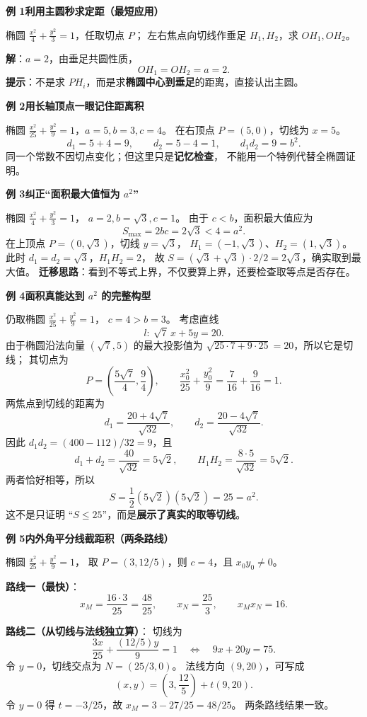 \begin{examplebox}
\textbf{例 1\quad 利用主圆秒求定距（最短应用）}

椭圆 $\frac{x^2}{4}+\frac{y^2}{3}=1$，任取切点 $P$；
左右焦点向切线作垂足 $H_1,H_2$，求 $OH_1,OH_2$。

\textbf{解}：$a=2$，由垂足共圆性质，
\[
\boxed{OH_1=OH_2=a=2}.
\]
\textbf{提示}：不是求 $PH_i$，而是求\textbf{椭圆中心到垂足}的距离，直接认出主圆。

\medskip
\textbf{例 2\quad 用长轴顶点一眼记住距离积}

椭圆 $\frac{x^2}{25}+\frac{y^2}{9}=1$，$a=5,b=3,c=4$。
在右顶点 $P=(5,0)$，切线为 $x=5$。
\[
d_1=5+4=9,\qquad d_2=5-4=1,
\qquad \boxed{d_1d_2=9=b^2}.
\]
同一个常数不因切点变化；但这里只是\textbf{记忆检查}，
不能用一个特例代替全椭圆证明。

\medskip
\textbf{例 3\quad 纠正“面积最大值恒为 $a^2$”}

椭圆 $\frac{x^2}{4}+\frac{y^2}{3}=1$，
$a=2,b=\sqrt3,c=1$。
由于 $c<b$，面积最大值应为
\[
\boxed{S_{\max}=2bc=2\sqrt3<4=a^2}.
\]
在上顶点 $P=(0,\sqrt3)$，切线 $y=\sqrt3$，
$H_1=(-1,\sqrt3)$、$H_2=(1,\sqrt3)$。
此时 $d_1=d_2=\sqrt3$，$H_1H_2=2$，
故 $S=(\sqrt3+\sqrt3)\cdot2/2=2\sqrt3$，确实取到最大值。
\textbf{迁移思路}：看到不等式上界，不仅要算上界，还要检查取等点是否存在。

\medskip
\textbf{例 4\quad 面积真能达到 $a^2$ 的完整构型}

仍取椭圆 $\frac{x^2}{25}+\frac{y^2}{9}=1$，
$c=4>b=3$。
考虑直线
\[
l:\ \sqrt7\,x+5y=20.
\]
由于椭圆沿法向量 $(\sqrt7,5)$ 的最大投影值为
$\sqrt{25\cdot7+9\cdot25}=20$，所以它是切线；
其切点为
\[
P=\left(\frac{5\sqrt7}{4},\frac94\right),\qquad
\frac{x_0^2}{25}+\frac{y_0^2}{9}=
\frac7{16}+\frac9{16}=1.
\]
两焦点到切线的距离为
\[
d_1=\frac{20+4\sqrt7}{\sqrt{32}},\qquad
 d_2=\frac{20-4\sqrt7}{\sqrt{32}}.
\]
因此 $d_1d_2=(400-112)/32=9$，且
\[
d_1+d_2=\frac{40}{\sqrt{32}}=5\sqrt2,
\qquad H_1H_2=\frac{8\cdot5}{\sqrt{32}}=5\sqrt2.
\]
两者恰好相等，所以
\[
\boxed{S=\frac12(5\sqrt2)(5\sqrt2)=25=a^2}.
\]
这不是只证明 ``$S\le25$''，而是\textbf{展示了真实的取等切线}。

\medskip
\textbf{例 5\quad 内外角平分线截距积（两条路线）}

椭圆 $\frac{x^2}{25}+\frac{y^2}{9}=1$，
取 $P=(3,12/5)$，则 $c=4$，且 $x_0y_0\ne0$。

\textbf{路线一（最快）}：
\[
x_M=\frac{16\cdot3}{25}=\frac{48}{25},\qquad
x_N=\frac{25}{3},\qquad
\boxed{x_Mx_N=16}.
\]

\textbf{路线二（从切线与法线独立算）}：
切线为
\[
\frac{3x}{25}+\frac{(12/5)y}{9}=1
\quad\Longleftrightarrow\quad 9x+20y=75.
\]
令 $y=0$，切线交点为 $N=(25/3,0)$。
法线方向 $(9,20)$，可写成
\[
(x,y)=\left(3,\frac{12}{5}\right)+t(9,20).
\]
令 $y=0$ 得 $t=-3/25$，故
$x_M=3-27/25=48/25$。
两条路线结果一致。


\end{examplebox}

